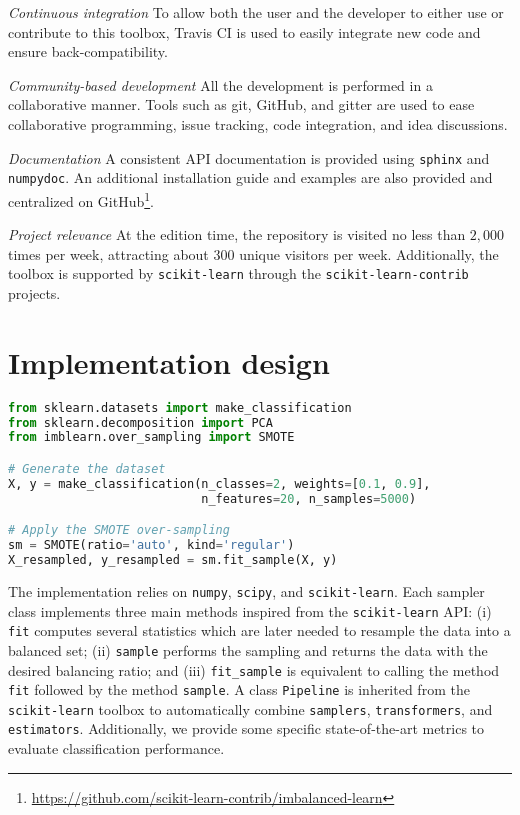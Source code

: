 \documentclass[twoside,11pt]{article}
\begin{document}
\noindent\textit{Continuous integration} To allow both the user and the developer to either use or contribute to this toolbox, Travis CI is used to easily integrate new code and ensure back-compatibility.

\noindent\textit{Community-based development} All the development is performed in a collaborative manner.
Tools such as git, GitHub, and gitter are used to ease collaborative programming, issue tracking, code integration, and idea discussions.

\noindent\textit{Documentation} A consistent API documentation is provided using \texttt{sphinx} and \texttt{numpydoc}.
An additional installation guide and examples are also provided and centralized on GitHub\footnote{\url{https://github.com/scikit-learn-contrib/imbalanced-learn}}.

\noindent\textit{Project relevance} At the edition time, the repository is visited no less than $2,000$ times per week, attracting about $300$ unique visitors per week.
Additionally, the toolbox is supported by \texttt{scikit-learn} through the \texttt{scikit-learn-contrib} projects.

\section{Implementation design}

\begin{lstlisting}[language=Python, caption=Code snippet to over-sample a dataset using SMOTE.]
from sklearn.datasets import make_classification
from sklearn.decomposition import PCA
from imblearn.over_sampling import SMOTE

# Generate the dataset
X, y = make_classification(n_classes=2, weights=[0.1, 0.9],
                           n_features=20, n_samples=5000)

# Apply the SMOTE over-sampling
sm = SMOTE(ratio='auto', kind='regular')
X_resampled, y_resampled = sm.fit_sample(X, y)
\end{lstlisting}

The implementation relies on \texttt{numpy}, \texttt{scipy}, and \texttt{scikit-learn}.
Each sampler class implements three main methods inspired from the \texttt{scikit-learn} API:
(i) \texttt{fit} computes several statistics which are later needed to resample the data into a balanced set;
(ii) \texttt{sample} performs the sampling and returns the data with the desired balancing ratio;
and (iii) \texttt{fit\_sample} is equivalent to calling the method \texttt{fit} followed by the method \texttt{sample}.
A class \texttt{Pipeline} is inherited from the \texttt{scikit-learn}
toolbox to automatically combine \texttt{samplers},
\texttt{transformers}, and \texttt{estimators}.
Additionally, we provide some specific state-of-the-art metrics to evaluate
classification performance.
\end{document}
